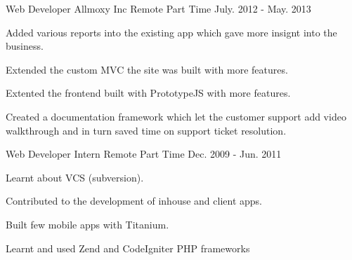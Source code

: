 \begin{cventries}
  \cventry
    {Web Developer} %
    {Allmoxy Inc} %
    {Remote Part Time} %
    {July. 2012 - May. 2013} %
    {
      \begin{cvitems} %
        \item {Added various reports into the existing app which gave more insignt into the business.}
        \item {Extended the custom MVC the site was built with more features.}
        \item {Extented the frontend built with PrototypeJS with more features.}
        \item {Created a documentation framework which let the customer support add video walkthrough and in turn saved time on support ticket resolution.}
      \end{cvitems}
    }

  \cventry
    {Web Developer Intern} %
    {} %
    {Remote Part Time} %
    {Dec. 2009 - Jun. 2011 } %
    {
      \begin{cvitems} %
      \item {Learnt about VCS (subversion).}
      \item {Contributed to the development of inhouse and client apps.}
      \item {Built few mobile apps with Titanium.}
      \item {Learnt and used Zend and CodeIgniter PHP frameworks}
      \end{cvitems}
    }


\end{cventries}
